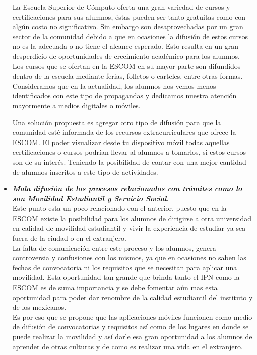 \begin{itemize}
		La Escuela Superior de Cómputo oferta una gran variedad de cursos y certificaciones para sus alumnos, éstas pueden ser tanto gratuitas como con algún costo no significativo. Sin embargo son desaprovechadas por un gran sector de la comunidad debido a que en ocasiones la difusión de estos cursos no es la adecuada o no tiene el alcance esperado. Esto resulta en un gran desperdicio de oportunidades de crecimiento académico para los alumnos.\\
		
		Los cursos que se ofertan en la ESCOM en su mayor parte son difundidos dentro de la escuela mediante ferias, folletos o carteles, entre otras formas. Consideramos que en la actualidad, los alumnos nos vemos menos identificados con este tipo de propagandas y dedicamos nuestra atención mayormente a medios digitales o móviles.
		
		Una solución propuesta es agregar otro tipo de difusión para que la comunidad esté informada de los recursos extracurriculares que ofrece la ESCOM. El poder visualizar desde tu dispositivo móvil todas aquellas certificaciones o cursos podrían llevar al alumnos a tomarlos, si estos cursos son de su interés. Teniendo la posibilidad de contar con una mejor cantidad de alumnos inscritos a este tipo de actividades.\\ 
		
		
		
		\item \textbf{\textit{Mala difusión de los procesos relacionados con trámites como lo son Movilidad Estudiantil y Servicio Social.}}\\
		
		Este punto esta un poco relacionado con el anterior, puesto que en la ESCOM existe la posibilidad para los alumnos de dirigirse a otra universidad en calidad de movilidad estudiantil y vivir la experiencia de estudiar ya sea fuera de la ciudad o en el extranjero. \\
		
		La falta de comunicación entre este proceso y los alumnos, genera controversia y confusiones con los mismos, ya que en ocasiones no saben las fechas de convocatoria ni los requisitos que se necesitan para aplicar una movilidad. Esta oportunidad tan grande que brinda tanto el IPN como la ESCOM es de suma importancia y se debe fomentar aún mas esta oportunidad para poder dar renombre de la calidad estudiantil del instituto y de los mexicanos.\\
		
		Es por eso que se propone que las aplicaciones móviles funcionen como medio de difusión de convocatorias y requisitos así como de los lugares en donde se puede realizar la movilidad y así darle esa gran oportunidad a los alumnos de aprender de otras culturas y de como es realizar una vida en el extranjero.\\
		
	\end{itemize}
	
